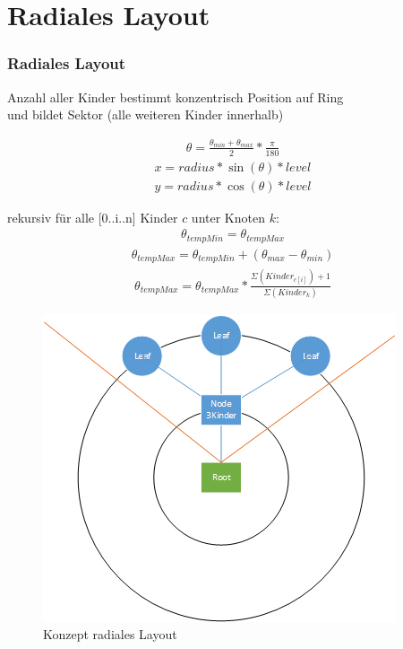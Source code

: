 \documentclass[11pt]{beamer}
\begin{document}
\section{Radiales Layout}
\begin{frame}[allowframebreaks]
\frametitle{Radiales Layout}

\begin{center}
Anzahl aller Kinder bestimmt konzentrisch Position auf Ring 
\\ und bildet Sektor (alle weiteren Kinder innerhalb)\\
\end{center}

\begin{align}
\theta = \frac{\theta_{min} + \theta_{max}}{2} * \frac{\pi}{180} 
\end{align}
\begin{align}
x = radius * \sin(\theta) * level
\\
y = radius * \cos(\theta) * level
\end{align} 

\framebreak
rekursiv für alle [0..i..n] Kinder $c$ unter Knoten $k$:
\begin{align}\theta_{tempMin} = \theta_{tempMax}\end{align}
\begin{align}\theta_{tempMax} = \theta_{tempMin} + (\theta_{max}-\theta_{min})\end{align} 
\begin{align}
\theta_{tempMax} = \theta_{tempMax} * \frac{\Sigma(Kinder_{c[i]})+1}{\Sigma(Kinder_k)}
\end{align}

\framebreak
\begin{figure}
\centering
\includegraphics[width=0.6\linewidth]{./radiall}
\caption{Konzept radiales Layout}
\label{fig:radiall}
\end{figure}


\end{frame}
\end{document}
